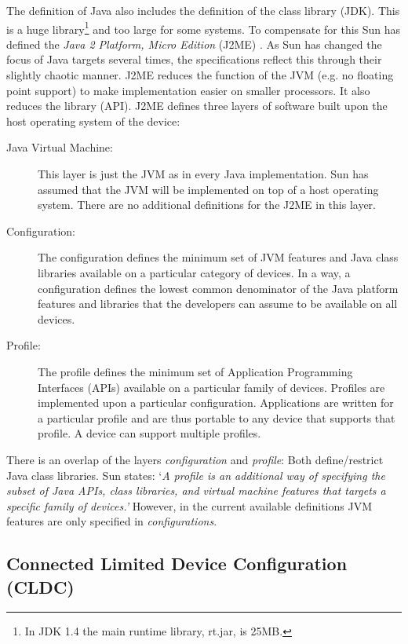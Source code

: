 The definition of Java also includes the definition of the class
library (JDK). This is a huge library\footnote{In JDK 1.4 the main
runtime library, rt.jar, is 25MB.} and too large for some systems.
To compensate for this Sun has defined the \textit{Java 2 Platform,
Micro Edition} (J2ME) \cite{J2ME}. As Sun has changed the focus of
Java targets several times, the specifications reflect this through
their slightly chaotic manner. J2ME reduces the function of the JVM
(e.g. no floating point support) to make implementation easier on
smaller processors. It also reduces the library (API). J2ME defines
three layers of software built upon the host operating system of the
device:
%
\begin{description}
    \item[Java Virtual Machine:] This layer is just the JVM as in every Java
implementation. Sun has assumed that the JVM will be implemented on
top of a host operating system. There are no additional definitions
for the J2ME in this layer.

    \item[Configuration:] The configuration defines the minimum set of JVM features
and Java class libraries available on a particular category of
devices. In a way, a configuration defines the lowest common
denominator of the Java platform features and libraries that the
developers can assume to be available on all devices.

    \item[Profile:] The profile defines the minimum set of Application
Programming Interfaces (APIs) available on a particular family of
devices. Profiles are implemented upon a particular configuration.
Applications are written for a particular profile and are thus
portable to any device that supports that profile. A device can
support multiple profiles.

\end{description}
%
There is an overlap of the layers \textit{configuration} and
\textit{profile}: Both define/restrict Java class libraries. Sun
states: `\textit{A profile is an additional way of specifying the
subset of Java APIs, class libraries, and virtual machine features
that targets a specific family of devices.'} However, in the current
available definitions JVM features are only specified in
\textit{configurations}.

\subsection{Connected Limited Device Configuration (CLDC)}
\label{subsec:cldc}

